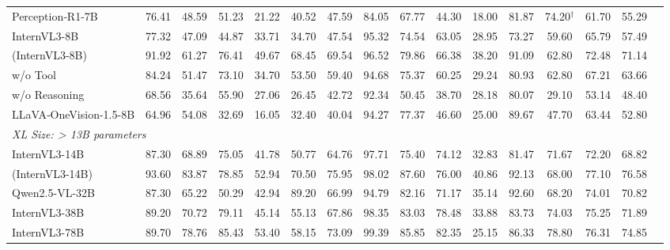 \begin{table}[t]
{\begin{tabular}{l @{\hskip2.5pt} | c c c c c | c | c c c c c c  | c | c c }
Perception‑R1-7B & 	76.41 &	48.59 &	51.23 &	21.22 &	40.52 &	47.59 &	84.05 &	67.77 &	44.30 &	18.00 &	81.87 & 74.20$^\dagger$ &	61.70	& 55.29 \\	
InternVL3-8B   & 77.32 & 47.09 &	44.87 &	33.71 &	34.70 &	47.54 &	95.32 &	74.54 &	63.05 &	28.95 &	73.27 &	59.60 &	65.79 &	57.49 \\ 
\rowcolor{teal!15}  \ours{} (InternVL3-8B) &  91.92 &	61.27 &	76.41 &	49.67 &	68.45 &	69.54 &	96.52 &	79.86 &	66.38 &	38.20 &	91.09 &	62.80 &	72.48 &	71.14 \\ 
\rowcolor{teal!4}  \quad w/o Tool  & 84.24 &	51.47 &	73.10 &	34.70 &	53.50 &	59.40 &	94.68 &	75.37 &	60.25 &	29.24 &	80.93 &	62.80 &	67.21 &	63.66 \\
\rowcolor{teal!4}  \quad w/o Reasoning  & 68.56 & 35.64 &	55.90 &	27.06 &	26.45 &	42.72 &	92.34 &	50.45 &	38.70 &	28.18 &	80.07 &	29.10 &	53.14 &	48.40 \\ 
LLaVA‑OneVision-1.5-8B & 64.96 & 54.08 & 32.69 & 16.05 & 32.40 & 40.04 &	94.27 &	77.37 &	46.60 &	25.00 &	89.67 &	47.70 &	63.44 &	52.80 \\
\midrule
\multicolumn{10}{l}{\textit{XL Size: > 13B parameters}}  \\
\midrule
InternVL3-14B &  87.30 &	68.89 &	75.05 &	41.78 &	50.77 &	64.76 &	97.71 &	75.40 &	74.12 &	32.83 &	81.47 &	71.67 &	72.20 &	68.82 \\
\rowcolor{blue!12}  \ours{} (InternVL3-14B) & 93.60 &	83.87 &	78.85 &	52.94 &	70.50 &	75.95 &	98.02 &	87.60 &	76.00 &	40.86 &	92.13 &	68.00 &	77.10 &	76.58   \\
Qwen2.5-VL-32B  & 87.30&	65.22&	50.29&	42.94&	89.20&	66.99&	94.79&	82.16&	71.17&	35.14&	92.60&	68.20&	74.01&	70.82	 \\
InternVL3-38B &  89.20 &	70.72 &	79.11 &	45.14 &	55.13 &	67.86 &	98.35 &	83.03 &	78.48 &	33.88 &	83.73 &	74.03 &	75.25 &	71.89 \\
InternVL3-78B  & 89.70&	78.76&	85.43&	53.40&	58.15&	73.09&	99.39&	85.85&	82.35&	25.15&	86.33&	78.80&	76.31& 74.85 \\


\bottomrule
\end{tabular}%
}
\label{tab:main_results}
\end{table}